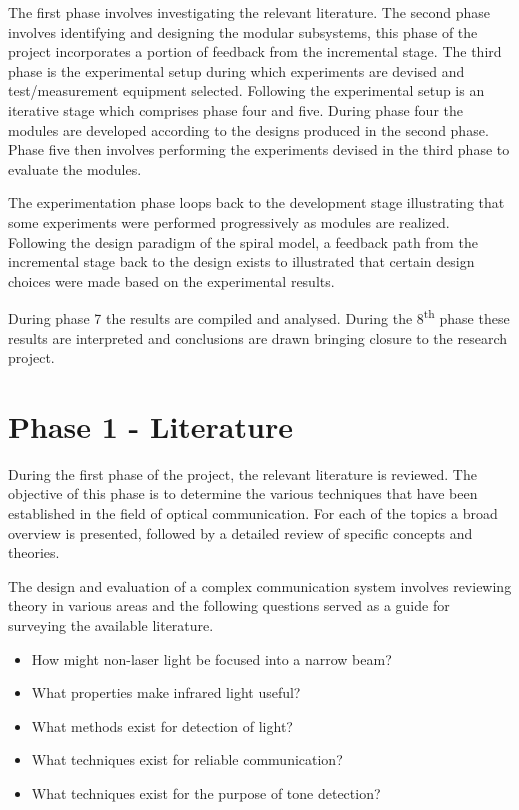 The first phase involves investigating the relevant literature. The second phase involves identifying and designing the modular subsystems, this phase of the project incorporates a portion of feedback from the incremental stage. The third phase is the experimental setup during which experiments are devised and test/measurement equipment selected. Following the experimental setup is an iterative stage which comprises phase four and five. During phase four the modules are developed according to the designs produced in the second phase. Phase five then involves performing the experiments devised in the third phase to evaluate the modules.

The experimentation phase loops back to the development stage illustrating that some experiments were performed progressively as modules are realized. Following the design paradigm of the spiral model, a feedback path from the incremental stage back to the design exists to illustrated that certain design choices were made based on the experimental results.

During phase 7 the results are compiled and analysed. During the 8\textsuperscript{th} phase these results are interpreted and conclusions are drawn bringing closure to the research project.


\section{Phase 1 - Literature}

During the first phase of the project, the relevant literature is reviewed. The objective of this phase is to determine the various techniques that have been established in the field of optical communication. For each of the topics a broad overview is presented, followed by a detailed review of specific concepts and theories.

The design and evaluation of a complex communication system involves reviewing theory in various areas and the following questions served as a guide for surveying the available literature.

\begin{itemize}
	\item How might non-laser light be focused into a narrow beam? %
	\item What properties make infrared light useful? %
	\item What methods exist for detection of light? %
	\item What techniques exist for reliable communication? %
	\item What techniques exist for the purpose of tone detection? %
\end{itemize}



